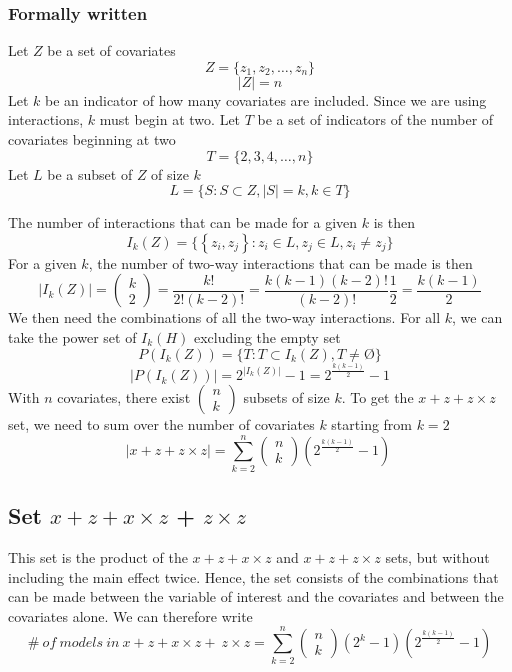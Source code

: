\subsubsection{Formally written}
Let $Z$ be a set of covariates 
\[Z=\{\left.z_1,z_2,\dots ,z_n\right.\}\] 
\[|Z|=n\] 
Let $k$ be an indicator of how many covariates are included. Since we are using interactions, $k$ must begin at two. Let $T$ be a set of indicators of the number of covariates beginning at two
\[T=\{\left.2,3,4,\dots ,n\right.\}\] 
Let $L$ be a subset of $Z$ of size $k$
\[L=\{\left.S:S\subset Z,\left|S\right|=k,k\in T\right.\}\] 

The number of interactions that can be made for a given $k$ is then
\[I_k\left(Z\right)=\{\left\{\left.z_i,z_j\right\}:z_i\in L,z_j\in L,z_i\neq z_j\right.\}\] 
For a given $k$, the number of two-way interactions that can be made is then
\[\left|I_k\left(Z\right)\right|=\left( \begin{array}{c}
k \\ 
2 \end{array}
\right)=\frac{k!}{2!\left(k-2\right)!}=\frac{k\left(k-1\right)\left(k-2\right)!}{\left(k-2\right)!}\frac{1}{2}=\frac{k\left(k-1\right)}{2}\] 
We then need the combinations of all the two-way interactions. For all $k$, we can take the power set of $I_k\left(H\right)$ excluding the empty set
\[P\left(I_k\left(Z\right)\right)=\{\left.T:T\subset I_k\left(Z\right),T\neq \textrm{\O}\right.\}\] 
\[\left|P\left(I_k\left(Z\right)\right)\right|=2^{\left|I_k\left(Z\right)\right|}-1=2^{\frac{k\left(k-1\right)}{2}}-1\] 
With $n$ covariates, there exist $\left( \begin{array}{c}
n \\ 
k \end{array}
\right)$ subsets of size $k$. To get the $x + z + z \times z$ set, we need to sum over the number of covariates $k$ starting from $k=2$
\[\left|x + z+z \times z\right|=\sum^n_{k=2}{\left( \begin{array}{c}
n \\ 
k \end{array}
\right)}\left(2^{\frac{k\left(k-1\right)}{2}}-1\right)\ \] 

\subsection{Set $x + z + x \times z$ + $z \times z$}
This set is the product of the $x + z + x \times z$ and $x + z + z \times z$ sets, but without including the main effect twice. Hence, the set consists of the combinations that can be made between the variable of interest and the covariates and between the covariates alone. We can therefore write 
\[\#\ of\ models\ in\ x + z + x \times z+\ z \times z=\sum^n_{k=2}{\left( \begin{array}{c}
n \\ 
k \end{array}
\right)\left(2^k-1\right)\left(2^{\frac{k\left(k-1\right)}{2}}-1\right)}\] 
